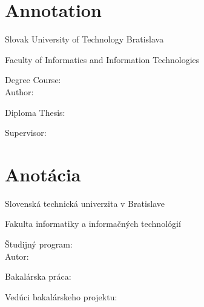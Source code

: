 
\thispagestyle{empty}

\section*{Annotation}

\begin{minipage}[t]{1\columnwidth}%
Slovak University of Technology Bratislava 

Faculty of Informatics and Information Technologies

Degree Course: \myStudyProgram\\

Author: \myName

Diploma Thesis: \myTitle

Supervisor: \mySupervisor

\myDate%
\end{minipage}

\bigskip{}

\lipsum[3]


\newpage{}\thispagestyle{empty}

\newpage
\thispagestyle{empty}
\mbox{}
\newpage

\thispagestyle{empty}
\section*{Anotácia}

\begin{minipage}[t]{1\columnwidth}%
Slovenská technická univerzita v Bratislave

Fakulta informatiky a informačných technológií

Študijný program: \myStudyProgram\\

Autor: \myName

Bakalárska práca: \myTitle

Vedúci bakalárskeho projektu: \mySupervisor

\myDate%
\end{minipage}

\bigskip{}

\lipsum[3]


\newpage{}\thispagestyle{empty}\medskip{}


\newpage{}

\newpage
\thispagestyle{empty}
\mbox{}
\newpage

\newpage
\thispagestyle{empty}
{}
{}
\newpage


\thispagestyle{empty}
\mbox{}
\newpage

